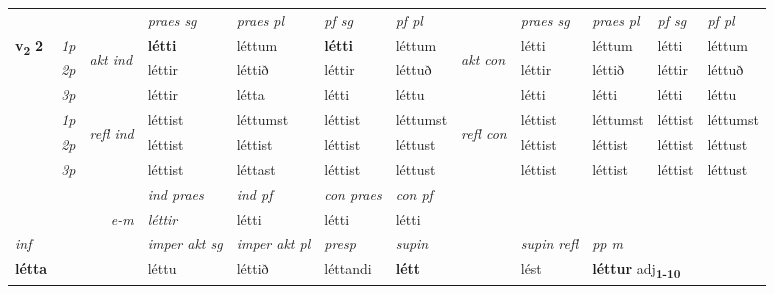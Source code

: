\begin{longtable}[l]{X>{\footnotesize\itshape}llXXXXlXXXX}
 & &   & \textit{praes sg}  & \textit{praes pl}    & \textit{ pf sg} & \textit{pf pl} & & \textit{praes sg}  & \textit{praes pl}    & \textit{pf sg} & \textit{pf pl }  \\ \cmidrule{4-7} \cmidrule{9-12}
 \multirow{2}{*}{{{\textbf{v{\textsubscript{2}}} \Large{\textbf{2}}}}}  & 1p & \multirow{3}{*}{\begin{turn}{90}\textit{akt ind}\end{turn}} & \textbf{létti} & léttum & \textbf{létti} & léttum & \multirow{3}{*}{\begin{turn}{90}\textit{akt con}\end{turn}} &létti & léttum & létti & léttum\\*
 & 2p &  &  léttir  & léttið & léttir & léttuð & & léttir & léttið & léttir & léttuð \\*
 & 3p &  & léttir & létta & létti & léttu & & létti & létti& létti & léttu \\*
\cmidrule{4-7} \cmidrule{9-12}
 & 1p & \multirow{3}{*}{\begin{turn}{90}\textit{refl ind}\end{turn}}  & léttist & léttumst & léttist & léttumst & \multirow{3}{*}{\begin{turn}{90}\textit{refl con}\end{turn}}  &léttist & léttumst & léttist & léttumst \\*
 & 2p &  & léttist & léttist & léttist & léttust & &léttist & léttist & léttist & léttust \\*
 & 3p  & & léttist & léttast & léttist & léttust & & léttist & léttist& léttist & léttust \\*
\cmidrule{4-7} \cmidrule{9-12}

   && &  \textit{ind praes} & \textit{ind pf} & \textit{con praes} & \textit{con pf} \\*
\multicolumn{3}{r}{\textit{e-m}} & léttir & létti & létti & létti \\*

\cmidrule{4-7}
   {\textit{inf}} & &  & \textit{imper akt sg} & \textit{imper akt pl}   & \textit{presp} & \textit{supin} && \textit{supin refl} & \textit{pp m} \\*
  {\textbf{létta}} & && léttu  & léttið   & léttandi &  \textbf{létt} && lést & \multicolumn{2}{l}{\textbf{léttur} adj\textbf{\textsubscript{1-10}}} \\*

\midrule


\end{longtable}
